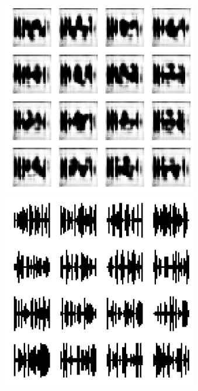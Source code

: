 \documentclass{article}
\begin{document}
\clearpage
\thispagestyle{empty}
\begin{figure}[ht]
\label{fig:gan-samples-reflection}
\centering
\includegraphics[height=323px]{gan-sample-fake-reflection.png}
\caption{}
\vspace{1em}
\includegraphics[height=323px]{gan-sample-real-reflection.png}
\end{figure}
\end{document}
